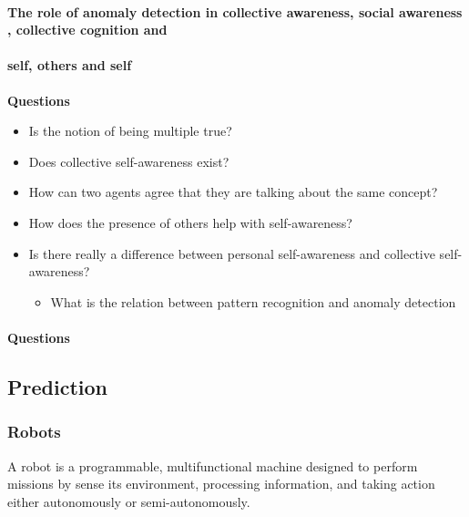 \documentclass{book}
\begin{document}
\paragraph{The role of anomaly detection in collective awareness, social awareness , collective cognition and }


\paragraph{self, others and self}
\textbf{Questions}
\begin{itemize}
    \item Is the notion of being multiple true?
    \item Does collective self-awareness exist?
    \item How can two agents agree that they are talking about the same concept?
    \item How does the presence of others help with self-awareness?
    \item Is there really a difference between personal self-awareness and collective self-awareness?
    \begin{itemize}
        \item What is the relation between pattern recognition and anomaly detection
    \end{itemize}
\end{itemize}


\paragraph{Questions}


\subsection{Prediction}


\subsubsection{Robots}
A robot is a programmable, multifunctional machine designed to perform missions by sense its environment, processing information, and taking action either autonomously or semi-autonomously.
\end{document}
